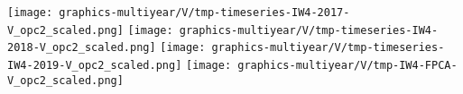 
\begin{center}
\begin{minipage}{7.0in}
\texttt{[image: graphics-multiyear/V/tmp-timeseries-IW4-2017-V\_opc2\_scaled.png]}
\quad\quad
\texttt{[image: graphics-multiyear/V/tmp-timeseries-IW4-2018-V\_opc2\_scaled.png]}
\vskip 1.0cm
\texttt{[image: graphics-multiyear/V/tmp-timeseries-IW4-2019-V\_opc2\_scaled.png]}
\quad
\texttt{[image: graphics-multiyear/V/tmp-IW4-FPCA-V\_opc2\_scaled.png]}
\end{minipage}
\end{center}


\renewcommand{\theenumi}{\roman{enumi}}
\renewcommand{\labelenumi}{\textnormal{(\theenumi)}$\;\;$}

